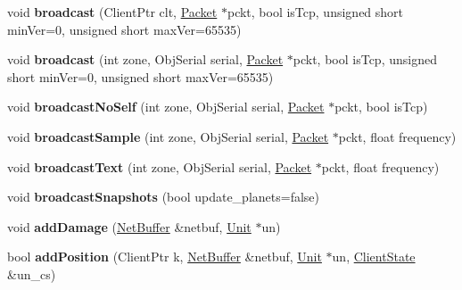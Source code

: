 \begin{DoxyCompactItemize}
\item 
void {\bfseries broadcast} (Client\+Ptr clt, \hyperlink{classPacket}{Packet} $\ast$pckt, bool is\+Tcp, unsigned short min\+Ver=0, unsigned short max\+Ver=65535)\hypertarget{classZoneMgr_aa9088e73ea52cf287737d709a1145614}{}\label{classZoneMgr_aa9088e73ea52cf287737d709a1145614}

\item 
void {\bfseries broadcast} (int zone, Obj\+Serial serial, \hyperlink{classPacket}{Packet} $\ast$pckt, bool is\+Tcp, unsigned short min\+Ver=0, unsigned short max\+Ver=65535)\hypertarget{classZoneMgr_a0904e780990264f07e30982ace224d2a}{}\label{classZoneMgr_a0904e780990264f07e30982ace224d2a}

\item 
void {\bfseries broadcast\+No\+Self} (int zone, Obj\+Serial serial, \hyperlink{classPacket}{Packet} $\ast$pckt, bool is\+Tcp)\hypertarget{classZoneMgr_aa8b1aabff53e9d45d491531d9851c9a9}{}\label{classZoneMgr_aa8b1aabff53e9d45d491531d9851c9a9}

\item 
void {\bfseries broadcast\+Sample} (int zone, Obj\+Serial serial, \hyperlink{classPacket}{Packet} $\ast$pckt, float frequency)\hypertarget{classZoneMgr_a749e15f42086d96dcea134b41d316dd3}{}\label{classZoneMgr_a749e15f42086d96dcea134b41d316dd3}

\item 
void {\bfseries broadcast\+Text} (int zone, Obj\+Serial serial, \hyperlink{classPacket}{Packet} $\ast$pckt, float frequency)\hypertarget{classZoneMgr_a6d7e4c223189cbcc5887df5e1bbf0c7c}{}\label{classZoneMgr_a6d7e4c223189cbcc5887df5e1bbf0c7c}

\item 
void {\bfseries broadcast\+Snapshots} (bool update\+\_\+planets=false)\hypertarget{classZoneMgr_a0ac5c7bb0c1ec793d042b6dc5b29b2d9}{}\label{classZoneMgr_a0ac5c7bb0c1ec793d042b6dc5b29b2d9}

\item 
void {\bfseries add\+Damage} (\hyperlink{classNetBuffer}{Net\+Buffer} \&netbuf, \hyperlink{classUnit}{Unit} $\ast$un)\hypertarget{classZoneMgr_a75e1e067f3f9b7d0c0cac2bdc5300f91}{}\label{classZoneMgr_a75e1e067f3f9b7d0c0cac2bdc5300f91}

\item 
bool {\bfseries add\+Position} (Client\+Ptr k, \hyperlink{classNetBuffer}{Net\+Buffer} \&netbuf, \hyperlink{classUnit}{Unit} $\ast$un, \hyperlink{classClientState}{Client\+State} \&un\+\_\+cs)\hypertarget{classZoneMgr_a9fd395edc1366c2e40bdbed2755b2e56}{}\label{classZoneMgr_a9fd395edc1366c2e40bdbed2755b2e56}


\end{DoxyCompactItemize}
